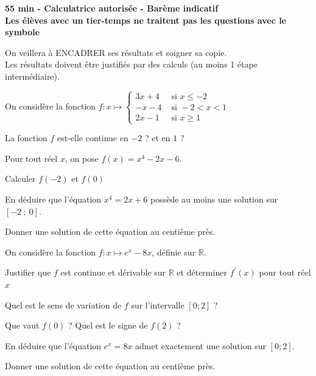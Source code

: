 \documentclass[11pt,a4paper]{article}  %
\begin{document}
	\graphicspath{{images/}}

	\begin{center}

	\end{center}
	\begin{center}\textbf{55 min - Calculatrice autorisée - Barème indicatif}\\
		\textbf{Les élèves avec un tier-temps ne traitent pas les questions avec  le symbole }
	\end{center}

	\begin{center}
		On veillera à ENCADRER ses résultats et soigner sa copie.\\
		Les résultats doivent être justifiés par des calculs (au moins 1 étape intermédiaire).
	\end{center}


On considère la fonction $f: x \mapsto \begin{cases}3 x+4 & \text { si } x \leqslant-2 \\ -x-4 & \text { si }-2<x<1  \\ 2x-1 & \text { si } x \geqslant 1\end{cases}$

La fonction $f$ est-elle continue en $-2$ ? et en $1$ ?


Pour tout réel $x$, on pose $f(x)=x^4-2 x-6$.
\begin{enumMet}
	\item {} Calculer $f(-2)$ et $f(0)$
	\item {} En déduire que l'équation $x^4=2 x+6$ possède au moins une solution sur $[-2\ ;\ 0]$.
	\item {} Donner une solution de cette équation au centième près.
\end{enumMet}



On considère la fonction $f: x \mapsto e^x-8 x$, définie sur $\mathbb{R}$.
\begin{enumMet}
	\item Justifier que $f$ est continue et dérivable sur $\mathbb{R}$ et déterminer $f^{\prime}(x)$ pour tout réel $x$
	\item Quel est le sens de variation de $f$ sur l'intervalle $[0 ; 2]$ ?
	\item Que vaut $f(0)$ ? Quel est le signe de $f(2)$ ?
	\item En déduire que l'équation $e^x=8 x$ admet exactement une solution sur $[0 ; 2]$.
	\item Donner une solution de cette équation au centième près.
\end{enumMet}
\end{document}
